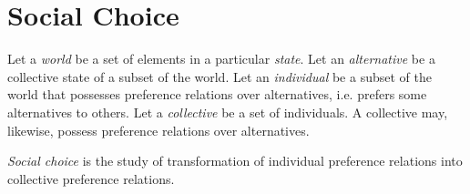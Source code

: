 

\section{Social Choice}

Let a \emph{world} be a set of elements in a particular \emph{state}. Let an
\emph{alternative} be a collective state of a subset of the world. Let an
\emph{individual} be a subset of the world that possesses preference relations
over alternatives, i.e. prefers some alternatives to others. Let a
\emph{collective} be a set of individuals. A collective may, likewise, possess
preference relations over alternatives.

\emph{Social choice} is the study of transformation of individual preference
relations into collective preference relations.

